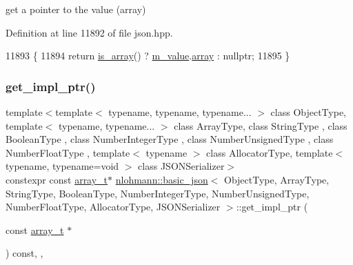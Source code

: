 get a pointer to the value (array) 



Definition at line 11892 of file json.\+hpp.


\begin{DoxyCode}
11893     \{
11894         \textcolor{keywordflow}{return} \hyperlink{classnlohmann_1_1basic__json_aef9ce5dd2381caee1f8ddcdb5bdd9c65}{is\_array}() ? \hyperlink{classnlohmann_1_1basic__json_aeb0814f76966f99290cb29e127c90a77}{m\_value}.\hyperlink{unionnlohmann_1_1basic__json_1_1json__value_a7947687f3ae1911d6e9847e2b3226157}{array} : \textcolor{keyword}{nullptr};
11895     \}
\end{DoxyCode}
\mbox{\label{classnlohmann_1_1basic__json_abefb50a81c9b91106d9ecadfcd1ee2b5}} 
\subsubsection{\texorpdfstring{get\+\_\+impl\+\_\+ptr()}{get\_impl\_ptr()}\hspace{0.1cm}{\footnotesize\ttfamily [4/14]}}
{\footnotesize\ttfamily template$<$template$<$ typename, typename, typename... $>$ class Object\+Type, template$<$ typename, typename... $>$ class Array\+Type, class String\+Type , class Boolean\+Type , class Number\+Integer\+Type , class Number\+Unsigned\+Type , class Number\+Float\+Type , template$<$ typename $>$ class Allocator\+Type, template$<$ typename, typename=void $>$ class J\+S\+O\+N\+Serializer$>$ \\
constexpr const \hyperlink{classnlohmann_1_1basic__json_ae095578e03df97c5b3991787f1056374}{array\+\_\+t}$\ast$ \hyperlink{classnlohmann_1_1basic__json}{nlohmann\+::basic\+\_\+json}$<$ Object\+Type, Array\+Type, String\+Type, Boolean\+Type, Number\+Integer\+Type, Number\+Unsigned\+Type, Number\+Float\+Type, Allocator\+Type, J\+S\+O\+N\+Serializer $>$\+::get\+\_\+impl\+\_\+ptr (\begin{DoxyParamCaption}\item[{const \hyperlink{classnlohmann_1_1basic__json_ae095578e03df97c5b3991787f1056374}{array\+\_\+t} $\ast$}]{ }\end{DoxyParamCaption}) const\hspace{0.3cm}{\ttfamily [inline]}, {\ttfamily [private]}, {\ttfamily [noexcept]}}



